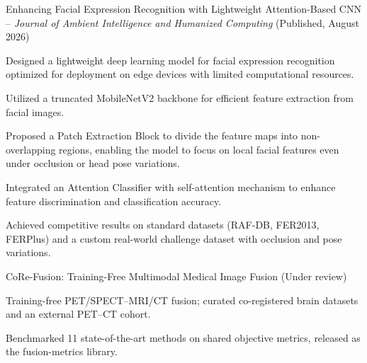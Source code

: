 \vspace{10pt}

\begin{cventries}

  \cventry
    {Enhancing Facial Expression Recognition with Lightweight Attention-Based CNN -- \emph{Journal of Ambient Intelligence and Humanized Computing} (Published, August 2026)}
    {}
    {
      \begin{cvitems}
        \item {Designed a lightweight deep learning model for facial expression recognition optimized for deployment on edge devices with limited computational resources.}
        \item {Utilized a truncated MobileNetV2 backbone for efficient feature extraction from facial images.}
        \item {Proposed a Patch Extraction Block to divide the feature maps into non-overlapping regions, enabling the model to focus on local facial features even under occlusion or head pose variations.}
        \item {Integrated an Attention Classifier with self-attention mechanism to enhance feature discrimination and classification accuracy.}
        \item {Achieved competitive results on standard datasets (RAF-DB, FER2013, FERPlus) and a custom real-world challenge dataset with occlusion and pose variations.}
      \end{cvitems}
    }

\end{cventries}

\vspace{4pt}

\begin{cventries}

  \cventry
    {CoRe-Fusion: Training-Free Multimodal Medical Image Fusion (Under review)}
    {}
    {
      \begin{cvitems}
        \item {Training-free PET/SPECT--MRI/CT fusion; curated co-registered brain datasets and an external PET--CT cohort.}
        \item {Benchmarked 11 state-of-the-art methods on shared objective metrics, released as the fusion-metrics library.}
      \end{cvitems}
    }

\end{cventries}


